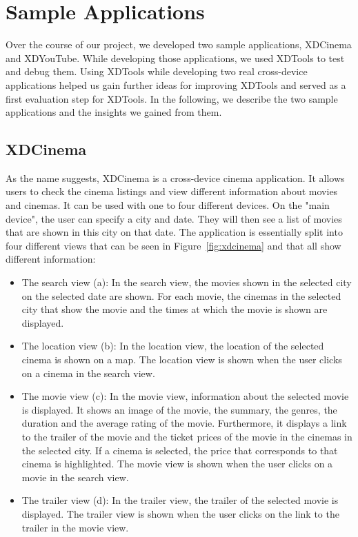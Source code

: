 \chapter{Sample Applications}

Over the course of our project, we developed two sample applications, XDCinema and XDYouTube. While developing those applications, we used XDTools to test and debug them. Using XDTools while developing two real cross-device applications helped us gain further ideas for improving XDTools and served as a first evaluation step for XDTools. In the following, we describe the two sample applications and the insights we gained from them.

\section{XDCinema}

As the name suggests, XDCinema is a cross-device cinema application. It allows users to check the cinema listings and view different information about movies and cinemas. It can be used with one to four different devices. On the "main device", the user can specify a city and date. They will then see a list of movies that are shown in this city on that date. The application is essentially split into four different views that can be seen in Figure~\ref{fig:xdcinema} and that all show different information:
\begin{itemize}
	\item The search view (a): In the search view, the movies shown in the selected city on the selected date are shown. For each movie, the cinemas in the selected city that show the movie and the times at which the movie is shown are displayed.
	\item The location view (b): In the location view, the location of the selected cinema is shown on a map. The location view is shown when the user clicks on a cinema in the search view.
	\item The movie view (c): In the movie view, information about the selected movie is displayed. It shows an image of the movie, the summary, the genres, the duration and the average rating of the movie. Furthermore, it displays a link to the trailer of the movie and the ticket prices of the movie in the cinemas in the selected city. If a cinema is selected, the price that corresponds to that cinema is highlighted. The movie view is shown when the user clicks on a movie in the search view.
	\item The trailer view (d): In the trailer view, the trailer of the selected movie is displayed. The trailer view is shown when the user clicks on the link to the trailer in the movie view.
\end{itemize}

